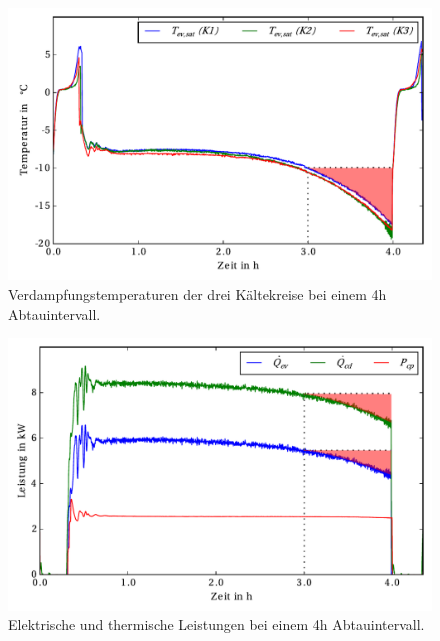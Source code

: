 \begin{figure}[h!]
\centering
\includegraphics[scale=0.8]{Pictures/50evaploss1.pdf}
\caption{Verdampfungstemperaturen der drei Kältekreise bei einem 4h Abtauintervall.}
\label{fig:SinkenVerdampfung4h3h}
\end{figure}

\begin{figure}[h!]
\centering
%
\includegraphics[scale=0.8]{Pictures/50powerloss.pdf}
\caption{Elektrische und thermische Leistungen bei einem 4h Abtauintervall.}
\label{fig:Leistungsverlust4h3h}
\end{figure}



